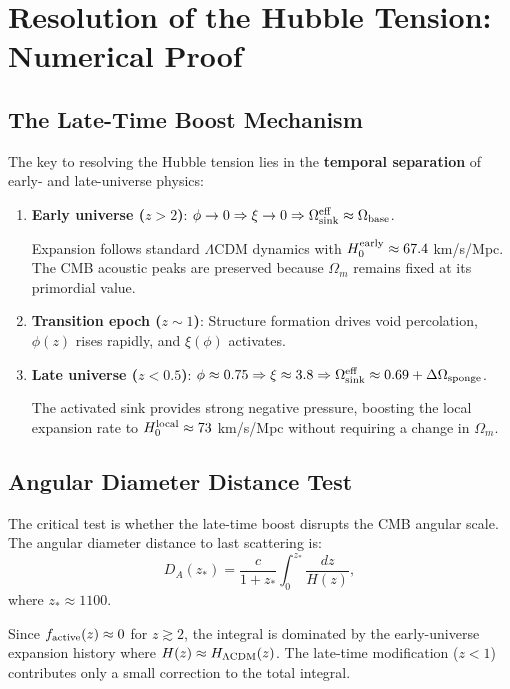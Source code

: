 \documentclass[12pt,a4paper]{article}
\begin{document}
\section{Resolution of the Hubble Tension: Numerical Proof}

\subsection{The Late-Time Boost Mechanism}

The key to resolving the Hubble tension lies in the \textbf{temporal separation} of early- and late-universe physics:

\begin{enumerate}
    \item \textbf{Early universe ($z > 2$)}: $\phi \to 0 \Rightarrow \xi \to 0 \Rightarrow \Omega_{\rm sink}^{\rm eff} \approx \Omega_{\rm base}$.
    
    Expansion follows standard $\Lambda$CDM dynamics with $H_0^{\rm early} \approx 67.4$ km/s/Mpc. The CMB acoustic peaks are preserved because $\Omega_m$ remains fixed at its primordial value.
    
    \item \textbf{Transition epoch ($z \sim 1$)}: Structure formation drives void percolation, $\phi(z)$ rises rapidly, and $\xi(\phi)$ activates.
    
    \item \textbf{Late universe ($z < 0.5$)}: $\phi \approx 0.75 \Rightarrow \xi \approx 3.8 \Rightarrow \Omega_{\rm sink}^{\rm eff} \approx 0.69 + \Delta\Omega_{\rm sponge}$.
    
    The activated sink provides strong negative pressure, boosting the local expansion rate to $H_0^{\rm local} \approx 73$ km/s/Mpc without requiring a change in $\Omega_m$.
\end{enumerate}

\subsection{Angular Diameter Distance Test}

The critical test is whether the late-time boost disrupts the CMB angular scale. The angular diameter distance to last scattering is:
\begin{equation}
D_A(z_*) = \frac{c}{1+z_*} \int_0^{z_*} \frac{dz}{H(z)},
\end{equation}
where $z_* \approx 1100$.

Since $f_{\rm active}(z) \approx 0$ for $z \gtrsim 2$, the integral is dominated by the early-universe expansion history where $H(z) \approx H_{\Lambda{\rm CDM}}(z)$. The late-time modification ($z < 1$) contributes only a small correction to the total integral.
\end{document}
